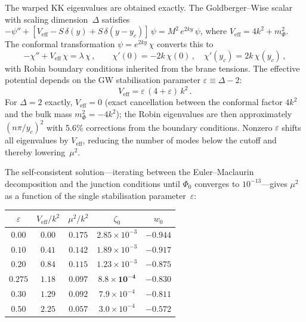 The warped KK eigenvalues are obtained exactly.  The Goldberger--Wise scalar with scaling dimension~$\Delta$ satisfies $-\psi'' + [V_{\mathrm{eff}} - S\,\delta(y) + S\,\delta(y-y_c)]\,\psi = M^2\, e^{2ky}\,\psi$, where $V_{\mathrm{eff}} = 4k^2 + m_\Phi^2$.  The conformal transformation $\psi = e^{2ky}\,\chi$ converts this to
\begin{equation}
  -\chi'' + V_{\mathrm{eff}}\, \chi = \lambda\, \chi\,,
  \qquad \chi'(0) = -2k\,\chi(0)\,,\quad \chi'(y_c) = 2k\,\chi(y_c)\,,
  \label{eq:4-robin-eigenvalue}
\end{equation}
with Robin boundary conditions inherited from the brane tensions.  The effective potential depends on the GW stabilisation parameter $\varepsilon \equiv \Delta - 2$:
\begin{equation}
  V_{\mathrm{eff}} = \varepsilon\,(4 + \varepsilon)\, k^2\,.
  \label{eq:4-veff-epsilon}
\end{equation}
For $\Delta = 2$ exactly, $V_{\mathrm{eff}} = 0$ (exact cancellation between the conformal factor $4k^2$ and the bulk mass $m_\Phi^2 = -4k^2$); the Robin eigenvalues are then approximately $(n\pi/y_c)^2$ with 5.6\% corrections from the boundary conditions.  Nonzero $\varepsilon$ shifts all eigenvalues by $V_{\mathrm{eff}}$, reducing the number of modes below the cutoff and thereby lowering~$\mu^2$.

The self-consistent solution---iterating between the Euler--Maclaurin decomposition and the junction conditions until $\Phi_0$ converges to $10^{-13}$---gives $\mu^2$ as a function of the single stabilisation parameter~$\varepsilon$:
\begin{center}
\begin{tabular}{@{}ccccc@{}}
\toprule
$\varepsilon$ & $V_{\mathrm{eff}}/k^2$ & $\mu^2/k^2$ & $\zeta_0$ & $w_0$ \\
\midrule
$0.00$  & $0.00$ & $0.175$ & $2.85 \times 10^{-3}$ & $-0.944$ \\
$0.10$  & $0.41$ & $0.142$ & $1.89 \times 10^{-3}$ & $-0.917$ \\
$0.20$  & $0.84$ & $0.115$ & $1.23 \times 10^{-3}$ & $-0.875$ \\
$\mathbf{0.275}$  & $\mathbf{1.18}$ & $\mathbf{0.097}$ & $\mathbf{8.8 \times 10^{-4}}$ & $\mathbf{-0.830}$ \\
$0.30$  & $1.29$ & $0.092$ & $7.9 \times 10^{-4}$ & $-0.811$ \\
$0.50$  & $2.25$ & $0.057$ & $3.0 \times 10^{-4}$ & $-0.572$ \\
\bottomrule
\end{tabular}
\end{center}

